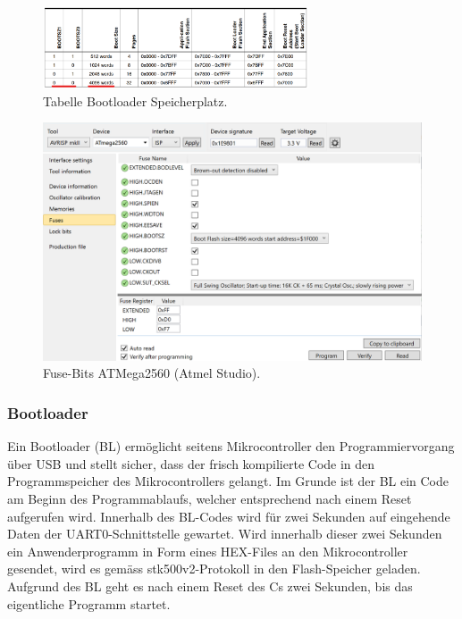 \begin{figure}[H]
	\centering
	\includegraphics[width=0.7\textwidth]{graphics/Tabelle_Bootloader}
	\caption{Tabelle Bootloader Speicherplatz.\cite[S.320]{atmel_atmel_2014}}
	\label{fig:Tabelle_Bootloader}
\end{figure}

\begin{figure}[H]
	\centering
	\includegraphics[width=\textwidth]{graphics/AtmelStudio_Fuses}
	\caption{Fuse-Bits ATMega2560 (Atmel Studio).}
	\label{fig:AtmelStudio_Fuses}
\end{figure}

\subsubsection{Bootloader}\label{Appendix:Inbetriebnahme_Bootloader}

Ein Bootloader (BL) ermöglicht seitens Mikrocontroller den Programmiervorgang über USB und stellt sicher, dass der frisch kompilierte Code in den Programmspeicher des Mikrocontrollers gelangt. Im Grunde ist der BL ein Code am Beginn des Programmablaufs, welcher entsprechend nach einem Reset aufgerufen wird. Innerhalb des BL-Codes wird für zwei Sekunden auf eingehende Daten der UART0-Schnittstelle gewartet.
Wird innerhalb dieser zwei Sekunden ein Anwenderprogramm in Form eines HEX-Files an den Mikrocontroller gesendet, wird es gemäss stk500v2-Protokoll in den Flash-Speicher geladen.
Aufgrund des BL geht es nach einem Reset des \textmu Cs zwei Sekunden, bis das eigentliche Programm startet. \cite{atmel_avr068_2006}

